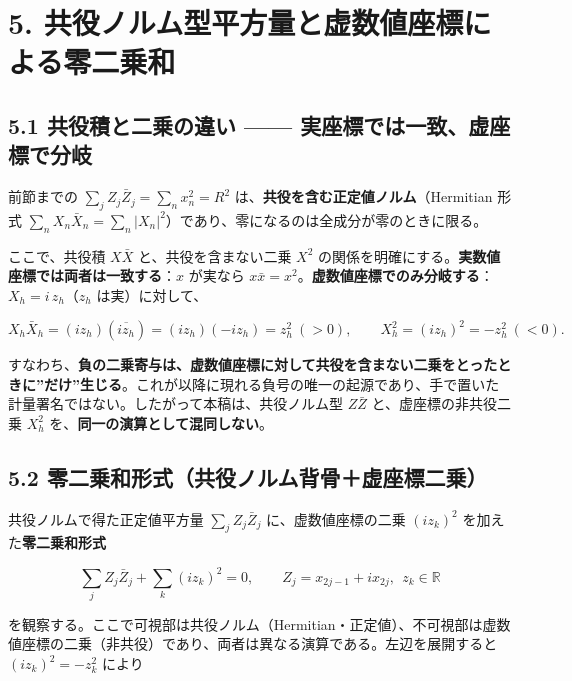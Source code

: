 \documentclass[11pt,a4paper]{ltjsarticle}
\begin{document}
\section{5.
共役ノルム型平方量と虚数値座標による零二乗和}\label{ux5171ux5f79ux30ceux30ebux30e0ux578bux5e73ux65b9ux91cfux3068ux865aux6570ux5024ux5ea7ux6a19ux306bux3088ux308bux96f6ux4e8cux4e57ux548c}

\subsection{5.1 共役積と二乗の違い ------
実座標では一致、虚座標で分岐}\label{ux5171ux5f79ux7a4dux3068ux4e8cux4e57ux306eux9055ux3044-ux5b9fux5ea7ux6a19ux3067ux306fux4e00ux81f4ux865aux5ea7ux6a19ux3067ux5206ux5c90}

前節までの \(\sum_j Z_j\bar Z_j=\sum_n x_n^2=R^2\)
は、\textbf{共役を含む正定値ノルム}（Hermitian 形式
\(\sum_n X_n\bar X_n=\sum_n|X_n|^2\)）であり、零になるのは全成分が零のときに限る。

ここで、共役積 \(X\bar X\) と、共役を含まない二乗 \(X^2\)
の関係を明確にする。\textbf{実数値座標では両者は一致する}：\(x\)
が実なら
\(x\bar x=x^2\)。\textbf{虚数値座標でのみ分岐する}：\(X_h=i\,z_h\)（\(z_h\)
は実）に対して、

\[
X_h\bar X_h=(i z_h)(\overline{i z_h})=(i z_h)(-i z_h)=z_h^2\ (>0),
\qquad
X_h^2=(i z_h)^2=-z_h^2\ (<0).
\]

すなわち、\textbf{負の二乗寄与は、虚数値座標に対して共役を含まない二乗をとったときに''だけ''生じる}。これが以降に現れる負号の唯一の起源であり、手で置いた計量署名ではない。したがって本稿は、共役ノルム型
\(Z\bar Z\) と、虚座標の非共役二乗 \(X_h^2\)
を、\textbf{同一の演算として混同しない}。

\subsection{5.2
零二乗和形式（共役ノルム背骨＋虚座標二乗）}\label{ux96f6ux4e8cux4e57ux548cux5f62ux5f0fux5171ux5f79ux30ceux30ebux30e0ux80ccux9aa8ux865aux5ea7ux6a19ux4e8cux4e57}

共役ノルムで得た正定値平方量 \(\sum_j Z_j\bar Z_j\) に、虚数値座標の二乗
\((i z_k)^2\) を加えた\textbf{零二乗和形式}

\[
\sum_j Z_j\bar Z_j+\sum_k (i z_k)^2=0,
\qquad Z_j=x_{2j-1}+i x_{2j},\ \ z_k\in\mathbb{R}
\]

を観察する。ここで可視部は共役ノルム（Hermitian・正定値）、不可視部は虚数値座標の二乗（非共役）であり、両者は異なる演算である。左辺を展開すると
\((i z_k)^2=-z_k^2\) により
\end{document}
